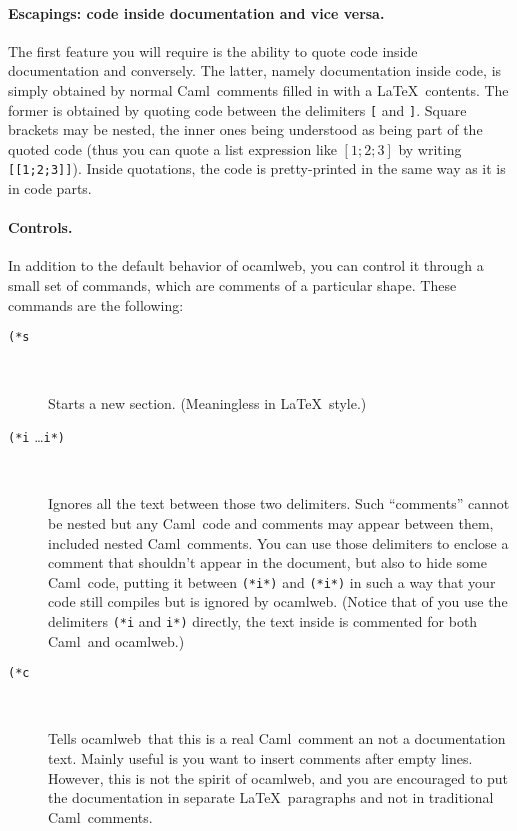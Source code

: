 \documentclass[12pt]{article}
\newcommand{\Caml}{\textsf{Caml}}
\newcommand{\ocamlweb}{\textsf{ocamlweb}}
\begin{document}
\paragraph{Escapings: code inside documentation and vice versa.}
The first feature you will require is the ability to quote code inside
documentation and conversely. The latter, namely documentation inside
code, is simply obtained by normal \Caml\ comments filled in with a
\LaTeX\ contents. The former is obtained by quoting code between the
delimiters \texttt{[} and \texttt{]}. Square brackets may be nested,
the inner ones being understood as being part of the quoted code (thus
you can quote a list expression like $[1;2;3]$ by writing
\texttt{[[1;2;3]]}). Inside quotations, the code is pretty-printed in
the same way as it is in code parts.


\paragraph{Controls.}
In addition to the default behavior of \ocamlweb, you can control it
through a small set of commands, which are comments of a particular
shape. These commands are the following:
\begin{description}

\item[\texttt{(*s}] ~\par
  
  Starts a new section. (Meaningless in \LaTeX\ style.)

\item[\texttt{(*i} \quad\dots\quad \texttt{i*)}] ~\par
  
  Ignores all the text between those two delimiters.  Such ``comments''
  cannot be nested but any \Caml\ code and comments may appear between
  them, included nested \Caml\ comments.  You can use those delimiters
  to enclose a comment that shouldn't appear in the document, but also
  to hide some \Caml\ code, putting it between \texttt{(*i*)} and
  \texttt{(*i*)} in such a way that your code still compiles but is
  ignored by \ocamlweb. (Notice that of you use the delimiters
  \texttt{(*i} and \texttt{i*)} directly, the text inside is commented
  for both \Caml\ and \ocamlweb.)

\item[\texttt{(*c}] ~\par
  
  Tells \ocamlweb\ that this is a real \Caml\ comment an not a
  documentation text. Mainly useful is you want to insert comments
  after empty lines. However, this is not the spirit of \ocamlweb, and
  you are encouraged to put the documentation in separate \LaTeX\ 
  paragraphs and not in traditional \Caml\ comments.

\end{description}
\end{document}
